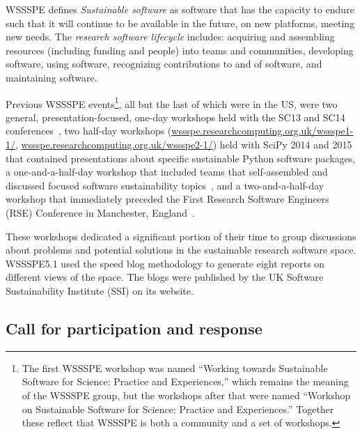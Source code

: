 \documentclass[11pt,letterpaper]{article}
\newcommand{\sdnote}[1]{ {\textcolor{darkgreen}    { ***Stephan: #1 }}}
\begin{document}
WSSSPE defines \emph{Sustainable software} as software that has the capacity to endure such that it will continue to
 be available in the future, on new platforms, meeting new needs.
 The \emph{research software lifecycle} includes:
 acquiring and assembling resources (including funding and people) into teams and communities,
 developing software,
 using software,
 recognizing contributions to and of software,
 and
 maintaining software.


Previous WSSSPE events\footnote{The first WSSSPE workshop was named ``Working towards Sustainable Software for Science: Practice and Experiences,'' which remains the meaning of the WSSSPE group, but the workshops after that were named ``Workshop on Sustainable Software for Science: Practice and Experiences.'' Together these reflect that WSSSPE is both a community and a set of workshops.},
all but the last of which were in the US, were two general, presentation-focused, one-day workshops held with the SC13 and SC14 conferences~\cite{WSSSPE1-pre-report,WSSSPE1,WSSSPE2-pre-report,WSSSPE2}, two half-day workshops (\href{http://wssspe.researchcomputing.org.uk/wssspe1-1/}{wssspe.researchcomputing.org.uk/wssspe1-1/}, \href{http://wssspe.researchcomputing.org.uk/wssspe2-1/}{wssspe.researchcomputing.org.uk/wssspe2-1/}) held with SciPy 2014 and 2015 that contained presentations about specific sustainable Python software packages, a one-and-a-half-day workshop that included teams that self-assembled and discussed focused software sustainability topics~\cite{WSSSPE3}, and a two-and-a-half-day workshop that immediately preceded the First Research Software Engineers (RSE) Conference in Manchester, England~\cite{WSSSPE4-report}.

These workshops dedicated a significant portion of their time to group discussions about problems and potential solutions in the sustainable research software space.  WSSSPE5.1 used the speed blog methodology to generate eight reports on different views of the space. The blogs were published by the UK Software Sustainability Institute (SSI) on its website.

\subsection{Call for participation and response} \label{sec:preworkshop}

\end{document}
